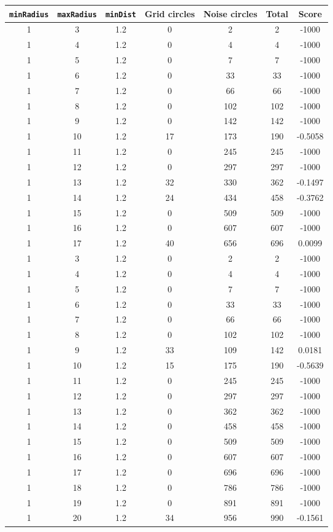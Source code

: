 \documentclass[letterpaper, 12pt]{article}
\begin{document}
\begin{longtable}{|c|c|c|c|c|c|c|}
\hline
\textbf{\texttt{minRadius}} & \textbf{\texttt{maxRadius}} & \textbf{\texttt{minDist}} & \textbf{Grid circles} & \textbf{Noise circles} & \textbf{Total} & \textbf{Score} \\
\hline
1 & 3 & 1.2 & 0 & 2 & 2 & -1000 \\
\hline
1 & 4 & 1.2 & 0 & 4 & 4 & -1000 \\
\hline
1 & 5 & 1.2 & 0 & 7 & 7 & -1000 \\
\hline
1 & 6 & 1.2 & 0 & 33 & 33 & -1000 \\
\hline
1 & 7 & 1.2 & 0 & 66 & 66 & -1000 \\
\hline
1 & 8 & 1.2 & 0 & 102 & 102 & -1000 \\
\hline
1 & 9 & 1.2 & 0 & 142 & 142 & -1000 \\
\hline
1 & 10 & 1.2 & 17 & 173 & 190 & -0.5058 \\
\hline
1 & 11 & 1.2 & 0 & 245 & 245 & -1000 \\
\hline
1 & 12 & 1.2 & 0 & 297 & 297 & -1000 \\
\hline
1 & 13 & 1.2 & 32 & 330 & 362 & -0.1497 \\
\hline
1 & 14 & 1.2 & 24 & 434 & 458 & -0.3762 \\
\hline
1 & 15 & 1.2 & 0 & 509 & 509 & -1000 \\
\hline
1 & 16 & 1.2 & 0 & 607 & 607 & -1000 \\
\hline
1 & 17 & 1.2 & 40 & 656 & 696 & 0.0099 \\
\hline
1 & 3 & 1.2 & 0 & 2 & 2 & -1000 \\
\hline
1 & 4 & 1.2 & 0 & 4 & 4 & -1000 \\
\hline
1 & 5 & 1.2 & 0 & 7 & 7 & -1000 \\
\hline
1 & 6 & 1.2 & 0 & 33 & 33 & -1000 \\
\hline
1 & 7 & 1.2 & 0 & 66 & 66 & -1000 \\
\hline
1 & 8 & 1.2 & 0 & 102 & 102 & -1000 \\
\hline
1 & 9 & 1.2 & 33 & 109 & 142 & 0.0181 \\
\hline
1 & 10 & 1.2 & 15 & 175 & 190 & -0.5639 \\
\hline
1 & 11 & 1.2 & 0 & 245 & 245 & -1000 \\
\hline
1 & 12 & 1.2 & 0 & 297 & 297 & -1000 \\
\hline
1 & 13 & 1.2 & 0 & 362 & 362 & -1000 \\
\hline
1 & 14 & 1.2 & 0 & 458 & 458 & -1000 \\
\hline
1 & 15 & 1.2 & 0 & 509 & 509 & -1000 \\
\hline
1 & 16 & 1.2 & 0 & 607 & 607 & -1000 \\
\hline
1 & 17 & 1.2 & 0 & 696 & 696 & -1000 \\
\hline
1 & 18 & 1.2 & 0 & 786 & 786 & -1000 \\
\hline
1 & 19 & 1.2 & 0 & 891 & 891 & -1000 \\
\hline
1 & 20 & 1.2 & 34 & 956 & 990 & -0.1561 \\
\hline
\end{longtable}
\end{document}
